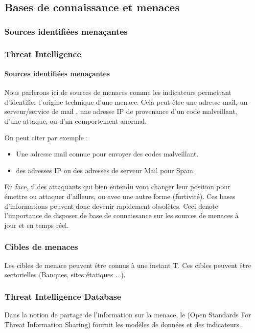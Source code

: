 \subsection{Bases de connaissance et menaces}

\subsubsection{Sources identifiées menaçantes}

\begin{frame}
\frametitle<presentation>{Threat Intelligence}
\framesubtitle<presentation>{Sources identifiées menaçantes}

Nous parlerons ici de sources de menaces comme les indicateurs permettant d'identifier l'origine technique d'une menace. Cela peut être une adresse mail, un serveur/service de mail , une adresse IP de provenance d'un code malveillant, d'une attaque, ou d'un comportement anormal.

On peut citer par exemple  :
\begin{itemize}
  \item Une adresse mail connue pour envoyer des codes malveillant.
  \item des adresses IP ou des adresses de serveur Mail pour Spam
\end{itemize}
\end{frame}

En face, il des attaquants qui bien entendu vont changer leur position pour émettre ou attaquer d'ailleurs, ou avec une autre forme (furtivité). Ces bases d'informations peuvent donc devenir rapidement obsolètes. Ceci denote l'importance de disposer de base de connaissance sur les sources de menaces à jour et en temps réel.

\subsubsection{Cibles de menaces}

Les cibles de menace peuvent être connus à une instant T. Ces cibles peuvent être  sectorielles (Banques, sites étatiques ...).


\subsubsection{Threat Intelligence Database }

Dans la notion de partage de l'information sur la menace, le  (Open Standards For Threat Information Sharing) fournit les modèles de données et des indicateurs.






